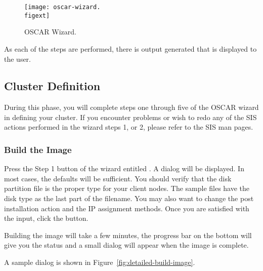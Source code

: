 \begin{figure}[htbp]
  \begin{center}
    \texttt{[image: oscar-wizard.\\figext]}
    \caption{OSCAR Wizard.}
    \label{fig:detailed-oscar-wizard}
  \end{center}
\end{figure}
  
As each of the steps are performed, there is output generated that is
displayed to the user. 


\subsection{Cluster Definition}
\label{sec:detailed-cluster-def}

During this phase, you will complete steps one through five of the
OSCAR wizard in defining your cluster. If you encounter problems or
wish to redo any of the SIS actions performed in the wizard steps 1,
or 2, please refer to the SIS man pages.

\subsubsection{Build the Image} 
\label{det:buildimage}

Press the Step 1 button of the wizard entitled . A dialog will be displayed. In most cases, the defaults 
will be sufficient. You should verify that the disk partition file is
the proper type for your client nodes. The sample files have the
disk type as the last part of the filename. You may also want to change
the post installation action and the IP assignment methods.
Once you are satisfied with the input, click the  button.

Building the image will take a few minutes, the progress bar on the bottom 
will give you the status and a small dialog will appear when the image
is complete.
  
A sample dialog is shown in Figure~\ref{fig:detailed-build-image}. 

